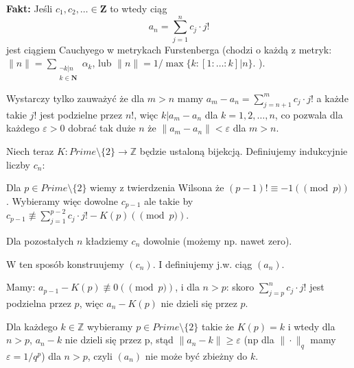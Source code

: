 \documentclass[12pt]{amsart}
\begin{document}
{\bf Fakt:} Jeśli $c_1, c_2,\ldots \in \mathbf{Z}$
to wtedy ciąg 
\[
  a_n = \sum_{j=1}^n c_j \cdot j!
\]
jest ciągiem Cauchyego w metrykach Furstenberga (chodzi o każdą z metryk: 
$\|n\| = \sum_{\substack{\neg k | n\\ k \in \mathbf{N}}} \alpha_k$, lub 
$\|n\| = 1/\max\{k: [1:\ldots:k] | n\}$.
).

Wystarczy tylko zauważyć że dla $m > n$ mamy
$a_m - a_n = \sum_{j=n+1}^m c_j \cdot j!$ a każde takie $j!$ jest 
podzielne przez $n!$, więc $k | a_m - a_n$ dla $k=1,2,\ldots,n$, 
co pozwala dla każdego $\varepsilon > 0$ dobrać tak duże $n$
że $\|a_m - a_n\| < \varepsilon$ dla $m > n$.


Niech teraz $K \colon \mathit{Prime}\setminus \{2\} \to \mathbb{Z}$ będzie
ustaloną bijekcją. Definiujemy indukcyjnie liczby $c_n$:

Dla $p \in \mathit{Prime}\setminus \{2\}$
wiemy z twierdzenia Wilsona że $(p-1)! \equiv -1(\pmod p)$.
Wybieramy więc dowolne $c_{p-1}$ ale takie by
$c_{p-1} \not\equiv \sum_{j=1}^{p-2} c_j \cdot j! - K(p) (\pmod p)$.

Dla pozostałych $n$ kładziemy $c_n$ dowolnie (możemy np. nawet zero).

W ten sposób konstruujemy $(c_n)$. I definiujemy j.w. ciąg $(a_n)$.

Mamy:
$a_{p-1} - K(p) \not\equiv 0 (\pmod p)$, 
i dla $n > p$: skoro $\sum_{j=p}^{n} c_j\cdot j!$ jest podzielna przez $p$,
więc $a_n - K(p)$ nie dzieli się przez $p$. 

Dla każdego $k\in\mathbb{Z}$ wybieramy $p\in\mathit{Prime}\setminus \{2\}$ takie że
$K(p) = k$ i wtedy dla $n > p$, $a_n - k$ nie dzieli się przez p,
stąd $\|a_n - k\| \geq \varepsilon$ (np dla 
$\|\cdot \|_q$ mamy $\varepsilon = 1/q^p$) dla $n > p$, czyli $(a_n)$
nie może być zbieżny do $k$.
\end{document}
